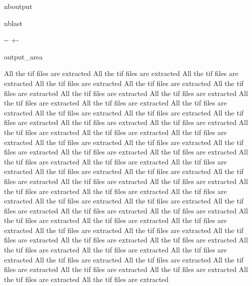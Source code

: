 \documentclass[letterpaper,10pt]{sphinxmanual}
\newlength\nbsphinxcodecellspacing
\begin{document}
\begin{sphinxuseclass}{nboutput}
\begin{sphinxuseclass}{nblast}
{

\kern-\sphinxverbatimsmallskipamount\kern-\baselineskip
\kern+\FrameHeightAdjust\kern-\fboxrule
\vspace{\nbsphinxcodecellspacing}

\begin{sphinxuseclass}{output_area}
\begin{sphinxuseclass}{}


\begin{sphinxVerbatim}[commandchars=\\\{\}]
All the tif files are extracted
All the tif files are extracted
All the tif files are extracted
All the tif files are extracted
All the tif files are extracted
All the tif files are extracted
All the tif files are extracted
All the tif files are extracted
All the tif files are extracted
All the tif files are extracted
All the tif files are extracted
All the tif files are extracted
All the tif files are extracted
All the tif files are extracted
All the tif files are extracted
All the tif files are extracted
All the tif files are extracted
All the tif files are extracted
All the tif files are extracted
All the tif files are extracted
All the tif files are extracted
All the tif files are extracted
All the tif files are extracted
All the tif files are extracted
All the tif files are extracted
All the tif files are extracted
All the tif files are extracted
All the tif files are extracted
All the tif files are extracted
All the tif files are extracted
All the tif files are extracted
All the tif files are extracted
All the tif files are extracted
All the tif files are extracted
All the tif files are extracted
All the tif files are extracted
All the tif files are extracted
All the tif files are extracted
All the tif files are extracted
All the tif files are extracted
All the tif files are extracted
All the tif files are extracted
All the tif files are extracted
All the tif files are extracted
All the tif files are extracted
All the tif files are extracted
All the tif files are extracted
All the tif files are extracted
All the tif files are extracted
All the tif files are extracted
All the tif files are extracted
All the tif files are extracted
All the tif files are extracted
All the tif files are extracted
All the tif files are extracted
All the tif files are extracted
All the tif files are extracted
All the tif files are extracted

\end{sphinxVerbatim}
\end{sphinxuseclass}
\end{sphinxuseclass}}
\end{sphinxuseclass}
\end{sphinxuseclass}
\end{document}
